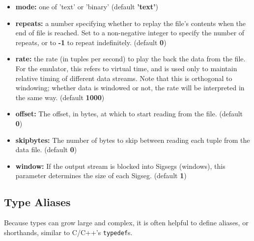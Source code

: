 \documentclass[twocolumn]{report}
\begin{document}
\begin{itemize}
\item {\bf mode:} one of 'text' or 'binary' (default {\bf 'text'})

\item {\bf repeats:} a number specifying whether to replay the file's
  contents when the end of file is reached.  Set to a non-negative
  integer to specify the number of repeats, or to {\bf -1} to repeat
  indefinitely.  (default {\bf 0})

\item {\bf rate:} the rate (in tuples per second) to play the back the
  data from the file.  For the emulator, this refers to virtual time,
  and is used only to maintain relative timing of different data
  streams.  Note that this is orthogonal to windowing; whether data is
  windowed or not, the rate will be interpreted in the same
  way. (default {\bf 1000}) 

\item {\bf offset:}
  The offset, in bytes, at which to start reading from the
  file. (default {\bf 0})

\item {\bf skipbytes:}
The number of bytes to skip between reading each tuple
  from the data file. (default {\bf 0})

\item {\bf window:} If the output stream is blocked into Sigsegs
  (windows), this parameter determines the size of each
  Sigseg. (default {\bf 1})

\end{itemize}





\subsection{Type Aliases}

Because types can grow large and complex, it is often helpful to
define aliases, or shorthands, similar to C/C++'s {\tt typedef}s.
\end{document}
